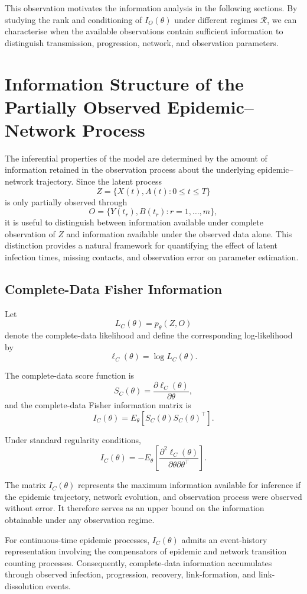 \documentclass[10pt]{article}
\begin{document}
This observation motivates the information analysis in the following sections. By studying the rank and conditioning of $I_O(\theta)$ under different regimes $\mathcal{R}$, we can characterise when the available observations contain sufficient information to distinguish transmission, progression, network, and observation parameters.


\section{Information Structure of the Partially Observed Epidemic--Network Process}
\label{sec4:inf-struc}
The inferential properties of the model are determined by the amount of information retained in the observation process about the underlying epidemic--network trajectory. Since the latent process
\[
Z=\{X(t),A(t):0\le t\le T\}
\]
is only partially observed through
\[
O=\{Y(t_r),B(t_r):r=1,\ldots,m\},
\]
it is useful to distinguish between information available under complete observation of $Z$ and information available under the observed data alone. This distinction provides a natural framework for quantifying the effect of latent infection times, missing contacts, and observation error on parameter estimation.

\subsection{Complete-Data Fisher Information}

Let
\[
L_C(\theta)=p_\theta(Z,O)
\]
denote the complete-data likelihood and define the corresponding log-likelihood by
\[
\ell_C(\theta)=\log L_C(\theta).
\]

The complete-data score function is
\[
S_C(\theta)
=
\frac{\partial \ell_C(\theta)}
{\partial\theta},
\]
and the complete-data Fisher information matrix is
\[
I_C(\theta)
=
E_\theta
\left[
S_C(\theta)S_C(\theta)^\top
\right].
\]

Under standard regularity conditions,
\[
I_C(\theta)
=
-
E_\theta
\left[
\frac{\partial^2\ell_C(\theta)}
{\partial\theta\partial\theta^\top}
\right].
\]

The matrix $I_C(\theta)$ represents the maximum information available for inference if the epidemic trajectory, network evolution, and observation process were observed without error. It therefore serves as an upper bound on the information obtainable under any observation regime.

For continuous-time epidemic processes, $I_C(\theta)$ admits an event-history representation involving the compensators of epidemic and network transition counting processes. Consequently, complete-data information accumulates through observed infection, progression, recovery, link-formation, and link-dissolution events.
\end{document}
